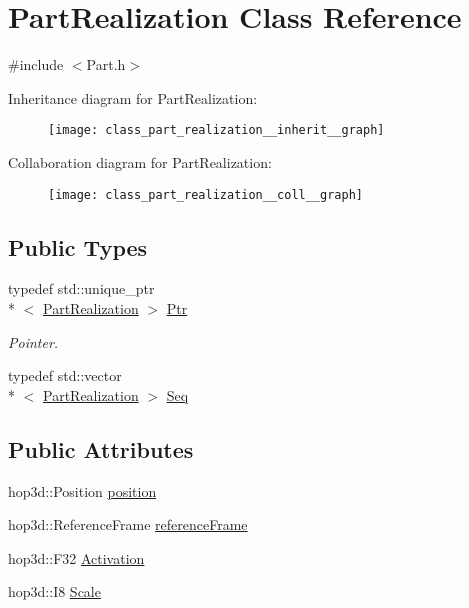 \hypertarget{class_part_realization}{\section{Part\-Realization Class Reference}
\label{class_part_realization}
}


{\ttfamily \#include $<$Part.\-h$>$}



Inheritance diagram for Part\-Realization\-:\nopagebreak
\begin{figure}[H]
\begin{center}
\leavevmode
\texttt{[image: class\_part\_realization\_\_inherit\_\_graph]}
\end{center}
\end{figure}


Collaboration diagram for Part\-Realization\-:\nopagebreak
\begin{figure}[H]
\begin{center}
\leavevmode
\texttt{[image: class\_part\_realization\_\_coll\_\_graph]}
\end{center}
\end{figure}
\subsection*{Public Types}
\begin{DoxyCompactItemize}
\item 
typedef std\-::unique\-\_\-ptr\\*
$<$ \hyperlink{class_part_realization}{Part\-Realization} $>$ \hyperlink{class_part_realization_aec2d1af3a61dba0792d0d95bf32e7118}{Ptr}
\begin{DoxyCompactList}\small\item\em Pointer. \end{DoxyCompactList}\item 
typedef std\-::vector\\*
$<$ \hyperlink{class_part_realization}{Part\-Realization} $>$ \hyperlink{class_part_realization_ac53d0830ece33a44aaf825f109e00f59}{Seq}
\end{DoxyCompactItemize}
\subsection*{Public Attributes}
\begin{DoxyCompactItemize}
\item 
hop3d\-::\-Position \hyperlink{class_part_realization_a64e569cf60fcec7d6e31c47ea0a46e6e}{position}
\item 
hop3d\-::\-Reference\-Frame \hyperlink{class_part_realization_a31f7d192d8e527643997fa79aba5c28c}{reference\-Frame}
\item 
hop3d\-::\-F32 \hyperlink{class_part_realization_a814790d0300a7f1b3be036031e92fec0}{Activation}
\item 
hop3d\-::\-I8 \hyperlink{class_part_realization_acd7a731093a911fc165649d1a4baa96d}{Scale}
\end{DoxyCompactItemize}


